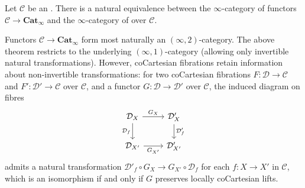 \begin{theorem} \label{theorem:straightening_unstraightening_equivalence_between_functors_to_Cat_infty_and_coCartesian_fibrations}
Let $\mathcal{C}$ be an . There is a natural equivalence between the $\infty$-category of functors $\mathcal{C} \to \mathbf{Cat}_\infty$ and the $\infty$-category of  over $\mathcal{C}$.

Functors $\mathcal{C} \to \mathbf{Cat}_\infty$ form most naturally an $(\infty, 2)$-category. The above theorem restricts to the underlying $(\infty, 1)$-category (allowing only invertible natural transformations). However, coCartesian fibrations retain information about non-invertible transformations: for two coCartesian fibrations $F : \mathcal{D} \to \mathcal{C}$ and $F' : \mathcal{D}' \to \mathcal{C}$ over $\mathcal{C}$, and a functor $G : \mathcal{D} \to \mathcal{D}'$ over $\mathcal{C}$, the induced diagram on fibres
\[
\begin{tikzcd}
\mathcal{D}_X \arrow[r, "G_X"] \arrow[d, "\mathcal{D}_f"'] & \mathcal{D}'_X \arrow[d, "\mathcal{D}'_f"] \\
\mathcal{D}_{X'} \arrow[r, "G_{X'}"' ] & \mathcal{D}'_{X'}
\end{tikzcd}
\]
admits a natural transformation $\mathcal{D}'_f \circ G_X \to G_{X'} \circ \mathcal{D}_f$ for each $f : X \to X'$ in $\mathcal{C}$, which is an isomorphism if and only if $G$ preserves locally coCartesian lifts.
\end{theorem}
